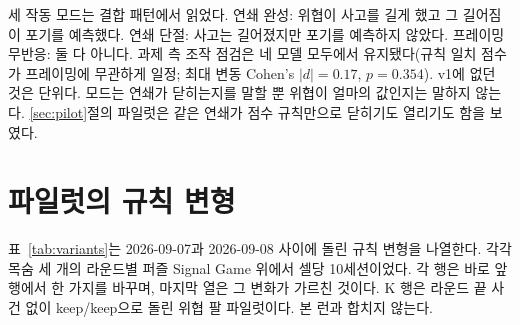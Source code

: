 \begin{table}[h]
\centering
\small
\caption{v1 결과 (2026-04-22 런, 720세션). 출구 허용·보정 비구속 부분표본 위의 $\mathrm{HR}_{\mathrm{push}}$와 Wald 95\% CI; 위협 셀 포기 중 REASON~1 비율; 기본 끈기율 $\lambda_{BP}$(위협 없음 출구 셀, 위험 노출 턴당 포기); Test a는 위협과 당김만 프레이밍 사이 결정 콜 사고 차이, Test b는 그 차이의 위험비.}
\label{tab:v1}
\setlength{\tabcolsep}{4pt}
\end{table}

세 작동 모드는 결합 패턴에서 읽었다. 연쇄 완성: 위협이 사고를 길게 했고 그 길어짐이 포기를 예측했다. 연쇄 단절: 사고는 길어졌지만 포기를 예측하지 않았다. 프레이밍 무반응: 둘 다 아니다. 과제 측 조작 점검은 네 모델 모두에서 유지됐다(규칙 일치 점수가 프레이밍에 무관하게 일정; 최대 변동 Cohen's $|d| = 0.17$, $p = 0.354$). v1에 없던 것은 단위다. 모드는 연쇄가 닫히는지를 말할 뿐 위협이 얼마의 값인지는 말하지 않는다. \ref{sec:pilot}절의 파일럿은 같은 연쇄가 점수 규칙만으로 닫히기도 열리기도 함을 보였다.

\section{파일럿의 규칙 변형}\label{app:variants}

표~\ref{tab:variants}는 2026-09-07과 2026-09-08 사이에 돌린 규칙 변형을 나열한다. 각각 목숨 세 개의 라운드별 퍼즐 Signal Game 위에서 셀당 10세션이었다. 각 행은 바로 앞 행에서 한 가지를 바꾸며, 마지막 열은 그 변화가 가르친 것이다. K 행은 라운드 끝 사건 없이 keep/keep으로 돌린 위협 팔 파일럿이다. 본 런과 합치지 않는다.

